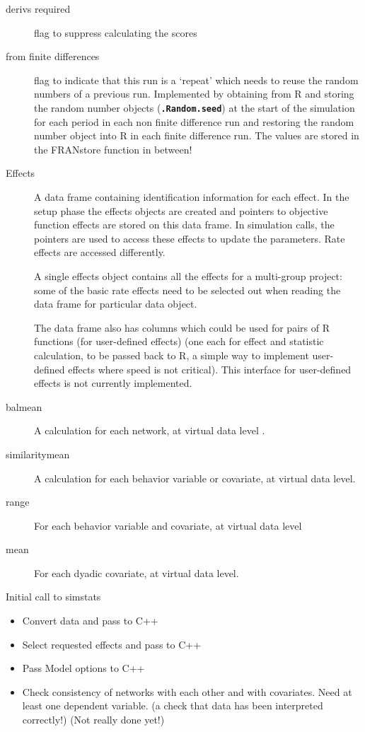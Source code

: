 \documentclass[12pt,a4paper]{article}
\makeatletter
\renewcommand{\=}{\,=\,}
\newcommand{\+}{\,+\,}
\newcommand{\nm}[1]{\textsf{\small #1}}
\newcommand{\R}{{\sf R }}
\newcommand{\sfn}[1]{\textbf{\texttt{#1}}}
\renewcommand{\section}{\@startsection{section}{1}
                {0pt}{\baselineskip}{0.5\baselineskip}
                {\centering\sffamily} }
\makeatother
\begin{document}
\begin{description}
\item[derivs required] flag to suppress calculating the scores
\item[from finite differences] flag to indicate that this run is a `repeat'
  which needs to reuse the random numbers of a previous run. Implemented by
  obtaining from \R and storing the random number objects (\sfn{.Random.seed})
  at the start of the simulation for each period in each non finite difference
  run and restoring the random number object into \R in each finite difference
  run. The values are stored in the \nm{FRANstore} function in between!
\item [Effects] A data frame containing identification information for
  each effect. In the setup phase the effects objects are created and pointers
  to objective function effects are stored on this data frame. In simulation
  calls, the pointers are used to access these effects to update the
  parameters. Rate effects are accessed differently.

  A single effects object contains all the effects for a multi-group project:
  some of the basic rate effects need to be selected out when reading the data
  frame for particular data object.

  The data frame also has columns which could be used for pairs of R functions
  (for user-defined effects) (one each for effect and statistic calculation, to
  be passed back to R, a simple way to implement user-defined effects where
  speed is not critical). This interface for user-defined effects is not
  currently implemented.
\item[balmean] A calculation for each network, at virtual data level .
\item[similaritymean] A calculation for each behavior variable or covariate, at
  virtual data level.
\item[range] For each behavior variable and covariate, at virtual data level
\item[mean] For each dyadic covariate, at virtual data level.
\end{description}
\section{Initial call to simstats}
\begin{itemize}
\item Convert data and pass to C++
\item Select requested effects and pass to C++
\item Pass Model options to C++
\item Check consistency of networks with each other and with covariates. Need at
  least one dependent variable. (a check that data has been interpreted
  correctly!) (Not really done yet!)
\end{itemize}
\end{document}
